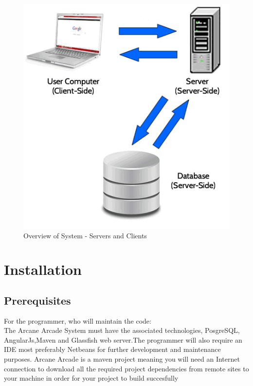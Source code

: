\documentclass[english]{article}
\begin{document}
	\begin{figure}[H]
	  
	 	\includegraphics[width=1.0\textwidth]{systemOverview.png}
	 	\caption{Overview of System - Servers and Clients}
	\end{figure}
 \newpage
 
 \section {Installation}
 
 \subsection{Prerequisites}
 For the programmer, who will maintain the code: \\ 
 \newline
 The Arcane Arcade System must have the associated technologies, PosgreSQL,\\AngularJs,Maven and Glassfish web server.The programmer will also require an IDE most preferably Netbeans for further development and maintenance purposes. Arcane Arcade is a maven project meaning you will need an Internet connection to download all the required project dependencies from remote sites to your machine in order for your project to build succesfully\\
 
\end{document}
